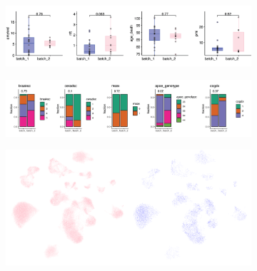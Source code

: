 \begin{figure}[ht]
    \begin{subfigure}[t]{\textwidth}
        \caption{}
        \includegraphics[width=\textwidth]{./extended_plots/seq_batch_cont.png}        
    \end{subfigure}
    \begin{subfigure}[t]{\textwidth}
        \caption{}
        \includegraphics[width=\textwidth]{./extended_plots/seq_batch_cat.png}        
    \end{subfigure}  
    \begin{subfigure}[t]{.6\textwidth}
        \caption{}
        \includegraphics[width=\textwidth]{./extended_plots/seq_batch_projection.png}        
    \end{subfigure}   
    \begin{subfigure}[t]{.3\textwidth}
        \caption{}

\end{subfigure}
\end{figure}
